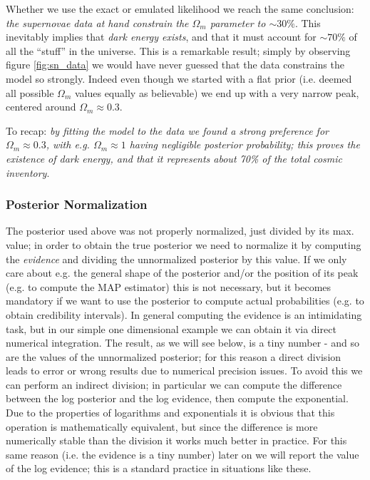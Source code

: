 Whether we use the exact or emulated likelihood we reach the same conclusion: \emph{the supernovae data at hand constrain the $\Omega_m$ parameter to $\sim 30\%$}. This inevitably implies that \emph{dark energy exists}, and that it must account for $\sim 70\%$ of all the ``stuff'' in the universe. 
This is a remarkable result; simply by observing figure \ref{fig:sn_data} we would have never guessed that the data constrains the model so strongly. Indeed even though we started with a flat prior (i.e. deemed all possible $\Omega_m$ values equally as believable) we end up with a very narrow peak, centered around $\Omega_m\approx 0.3$.

To recap: \emph{by fitting the model to the data we found a strong preference for $\Omega_m\approx 0.3$, with e.g. $\Omega_m\approx 1$ having negligible posterior probability; this proves the existence of dark energy, and that it represents about 70\% of the total cosmic inventory}.

\subsubsection{Posterior Normalization}
The posterior used above was not properly normalized, just divided by its max. value; in order to obtain the true posterior we need to normalize it by computing the \emph{evidence} and dividing the unnormalized posterior by this value. If we only care about e.g. the general shape of the posterior and/or the position of its peak (e.g. to compute the MAP estimator) this is not necessary, but it becomes mandatory if we want to use the posterior to compute actual probabilities (e.g. to obtain credibility intervals). 
In general computing the evidence is an intimidating task, but in our simple one dimensional example we can obtain it via direct numerical integration. The result, as we will see below, is a tiny number - and so are the values of the unnormalized posterior; for this reason a direct division leads to error or wrong results due to numerical precision issues. To avoid this we can perform an indirect division; in particular we can compute the difference between the log posterior and the log evidence, then compute the exponential. Due to the properties of logarithms and exponentials it is obvious that this operation is mathematically equivalent, but since the difference is more numerically stable than the division it works much better in practice. 
For this same reason (i.e. the evidence is a tiny number) later on we will report the value of the log evidence; this is a standard practice in situations like these.

